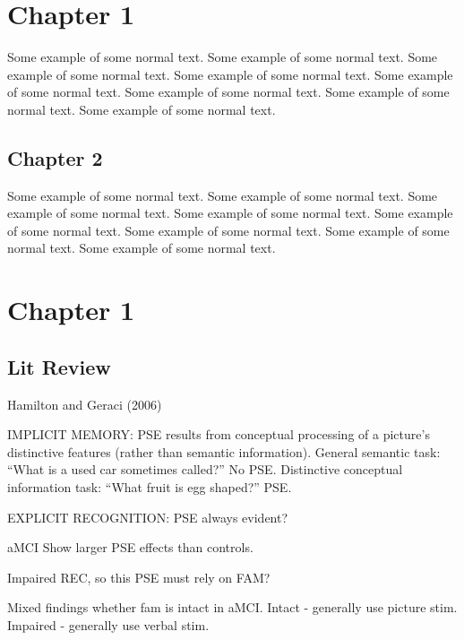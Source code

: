 \documentclass[
  11pt,
]{article}
\author{}
\date{\vspace{-2.5em}}
\begin{document}
{
\setcounter{tocdepth}{4}
\tableofcontents
}
\newpage

\hypertarget{chapter-1}{%
\section{Chapter 1}\label{chapter-1}}

Some example of some normal text. Some example of some normal text. Some
example of some normal text. Some example of some normal text. Some
example of some normal text. Some example of some normal text. Some
example of some normal text. Some example of some normal text.

\hypertarget{chapter-2}{%
\subsection{Chapter 2}\label{chapter-2}}

Some example of some normal text. Some example of some normal text. Some
example of some normal text. Some example of some normal text. Some
example of some normal text. Some example of some normal text. Some
example of some normal text. Some example of some normal text.

\newpage

\hypertarget{chapter-1-1}{%
\section{Chapter 1}\label{chapter-1-1}}

\hypertarget{lit-review}{%
\subsection{Lit Review}\label{lit-review}}

Hamilton and Geraci (2006)

IMPLICIT MEMORY: PSE results from conceptual processing of a picture's
distinctive features (rather than semantic information). General
semantic task: ``What is a used car sometimes called?'' No PSE.
Distinctive conceptual information task: ``What fruit is egg shaped?''
PSE.

EXPLICIT RECOGNITION: PSE always evident?

aMCI Show larger PSE effects than controls.

Impaired REC, so this PSE must rely on FAM?

Mixed findings whether fam is intact in aMCI. Intact - generally use
picture stim. Impaired - generally use verbal stim.
\end{document}
